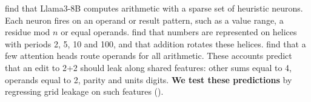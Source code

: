 \citet{nikankin2025heuristics} find that Llama3-8B computes arithmetic with a sparse set of heuristic neurons. Each neuron fires on an operand or result pattern, such as a value range, a residue mod $n$ or equal operands. \citet{kantamneni2025helix} find that numbers are represented on helices with periods 2, 5, 10 and 100, and that addition rotates these helices. \citet{zhang2024arithheads} find that a few attention heads route operands for all arithmetic. These accounts predict that an edit to 2+2 should leak along shared features: other sums equal to 4, operands equal to 2, parity and units digits. {\bf We test these predictions} by regressing grid leakage on such features ().
